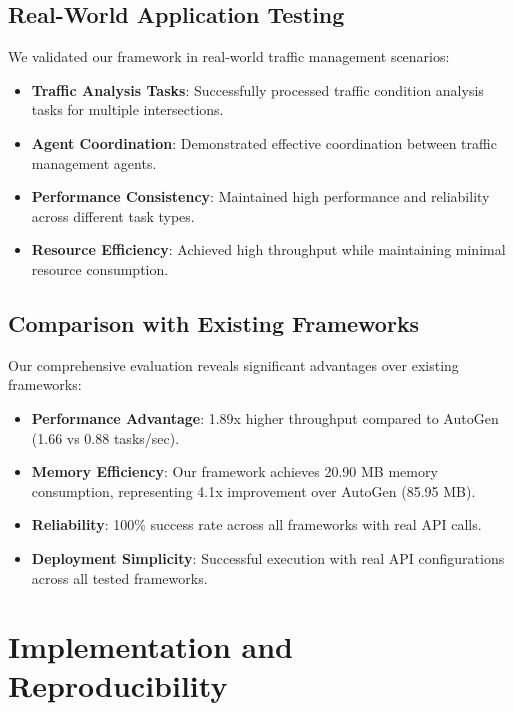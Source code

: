 \documentclass[conference]{IEEEtran}
\begin{document}
\subsection{Real-World Application Testing}

We validated our framework in real-world traffic management scenarios:

\begin{itemize}
\item \textbf{Traffic Analysis Tasks}: Successfully processed traffic condition analysis tasks for multiple intersections.

\item \textbf{Agent Coordination}: Demonstrated effective coordination between traffic management agents.

\item \textbf{Performance Consistency}: Maintained high performance and reliability across different task types.

\item \textbf{Resource Efficiency}: Achieved high throughput while maintaining minimal resource consumption.
\end{itemize}

\subsection{Comparison with Existing Frameworks}

Our comprehensive evaluation reveals significant advantages over existing frameworks:

\begin{itemize}
\item \textbf{Performance Advantage}: 1.89x higher throughput compared to AutoGen (1.66 vs 0.88 tasks/sec).

\item \textbf{Memory Efficiency}: Our framework achieves 20.90 MB memory consumption, representing 4.1x improvement over AutoGen (85.95 MB).

\item \textbf{Reliability}: 100\% success rate across all frameworks with real API calls.

\item \textbf{Deployment Simplicity}: Successful execution with real API configurations across all tested frameworks.
\end{itemize}

\section{Implementation and Reproducibility}
\end{document}
